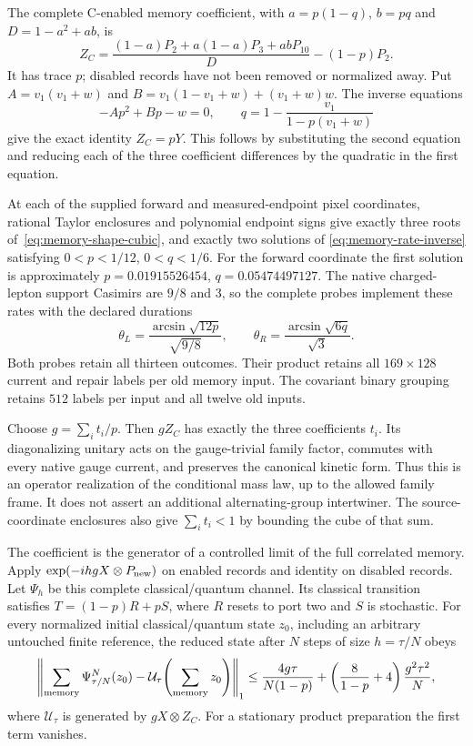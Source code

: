 The complete C-enabled memory coefficient, with $a=p(1-q)$,
$b=pq$ and $D=1-a^2+ab$, is
\begin{equation}
 Z_C=\frac{(1-a)P_2+a(1-a)P_3+abP_{10}}D-(1-p)P_2.
\end{equation}
It has trace $p$; disabled records have not been removed or normalized away.
Put $A=v_1(v_1+w)$ and
$B=v_1(1-v_1+w)+(v_1+w)w$. The inverse equations
\begin{equation}
 -Ap^2+Bp-w=0,\qquad
 q=1-\frac{v_1}{1-p(v_1+w)}
 \label{eq:memory-rate-inverse}
\end{equation}
give the exact identity $Z_C=pY$. This follows by substituting the second
equation and reducing each of the three coefficient differences by the
quadratic in the first equation.

At each of the supplied forward and measured-endpoint pixel coordinates,
rational Taylor enclosures and polynomial endpoint signs give exactly
three roots of~\eqref{eq:memory-shape-cubic}, and exactly two solutions of
\eqref{eq:memory-rate-inverse} satisfying $0<p<1/12$, $0<q<1/6$.
For the forward coordinate the first solution is approximately
$p=0.01915526454$, $q=0.05474497127$.
The native charged-lepton support Casimirs are $9/8$ and $3$, so the
complete probes implement these rates with the declared durations
\begin{equation}
 \theta_L=\frac{\arcsin\sqrt{12p}}{\sqrt{9/8}},\qquad
 \theta_R=\frac{\arcsin\sqrt{6q}}{\sqrt3}.
\end{equation}
Both probes retain all thirteen outcomes. Their product retains all
$169\times128$ current and repair labels per old memory input.
The covariant binary grouping retains $512$ labels per input and all
twelve old inputs.

Choose $g=\sum_i t_i/p$. Then $gZ_C$ has exactly the three coefficients
$t_i$. Its diagonalizing unitary acts on the gauge-trivial family factor,
commutes with every native gauge current, and preserves the canonical
kinetic form. Thus this is an operator realization of the conditional
mass law, up to the allowed family frame. It does not assert an additional
alternating-group intertwiner. The source-coordinate enclosures also give
$\sum_it_i<1$ by bounding the cube of that sum.

The coefficient is the generator of a controlled limit of the full
correlated memory. Apply $\exp(-ihgX\otimes P_{\rm new})$ on enabled
records and identity on disabled records. Let $\Psi_h$ be this complete
classical/quantum channel. Its classical transition satisfies
$T=(1-p)R+pS$, where $R$ resets to port two and $S$ is stochastic.
For every normalized initial classical/quantum state $z_0$, including
an arbitrary untouched finite reference, the reduced state after $N$
steps of size $h=\tau/N$ obeys
\begin{equation}
 \left\|\sum_{\rm memory}\Psi_{\tau/N}^{N}(z_0)
       -\mathcal U_\tau\!\left(\sum_{\rm memory}z_0\right)\right\|_1
 \le \frac{4g\tau}{N(1-p)}
       +\left(\frac8{1-p}+4\right)\frac{g^2\tau^2}{N},
 \label{eq:memory-mass-averaging}
\end{equation}
where $\mathcal U_\tau$ is generated by $gX\otimes Z_C$.
For a stationary product preparation the first term vanishes.

